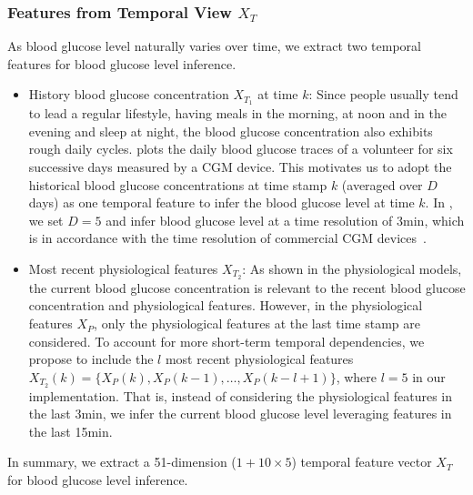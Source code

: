 \subsubsection{Features from Temporal View $X_T$}
As blood glucose level naturally varies over time, we extract two temporal features for blood glucose level inference.
\begin{itemize}
  \item
  History blood glucose concentration $X_{T_1}$ at time $k$:
  Since people usually tend to lead a regular lifestyle, \eg having meals in the morning, at noon and in the evening and sleep at night, the blood glucose concentration also exhibits rough daily cycles.
   plots the daily blood glucose traces of a volunteer for six successive days measured by a CGM device.
  This motivates us to adopt the historical blood glucose concentrations at time stamp $k$ (averaged over $D$ days) as one temporal feature to infer the blood glucose level at time $k$.
  In \sysname, we set $D=5$ and infer blood glucose level at a time resolution of 3min, which is in accordance with the time resolution of commercial CGM devices~\cite{bib:CGM_wave}.
  \item
  Most recent physiological features $X_{T_2}$:
  As shown in the physiological models, the current blood glucose concentration is relevant to the recent blood glucose concentration and physiological features.
  However, in the physiological features $X_P$, only the physiological features at the last time stamp are considered.
  To account for more short-term temporal dependencies, we propose to include the $l$ most recent physiological features $X_{T_2}(k) = \{X_P(k), X_P(k-1), \ldots, X_P(k-l+1)\}$, where $l=5$ in our implementation.
  That is, instead of considering the physiological features in the last 3min, we infer the current blood glucose level leveraging features in the last 15min.
\end{itemize}

In summary, we extract a 51-dimension ($1+10\times 5$) temporal feature vector $X_T$ for blood glucose level inference.

